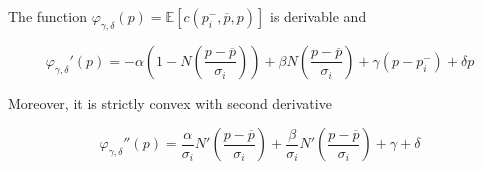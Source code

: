 \documentclass[10pt,a4paper]{amsart}
\begin{document}
\begin{proposition}
\label{prop:phigammadelta}
The function $\varphi_{\gamma,\delta}(p)=\mathbb{E}[c(p_i^-,\overline p,p)]$ is derivable and

\begin{equation}\label{eq:varphiprimo}
\varphi_{\gamma,\delta}'(p)=-\alpha\left(1-N\left(\frac{p-\overline p}{\sigma_i}\right)\right)+\beta N\left(\frac{p-\overline p}{\sigma_i}\right)+\gamma(p-p_i^-)+\delta p
\end{equation}


\noindent
Moreover, it is strictly convex with second derivative

\begin{equation}
\label{eq:varphisecondo}
\varphi_{\gamma,\delta}''(p)=\frac{\alpha}{\sigma_i}N'\left(\frac{p-\overline p}{\sigma_i}\right)+\frac{\beta}{\sigma_i}N'\left(\frac{p-\overline p}{\sigma_i}\right)+\gamma+\delta
\end{equation}
\end{proposition}
\end{document}
